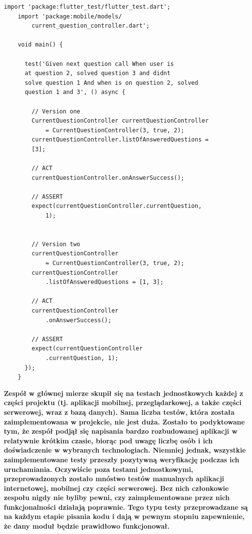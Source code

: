\documentclass[twoside]{projektInzynierskiMS}
\numberwithin{figure}{section}
\begin{document}
\begin{lstlisting}[caption=Zaimplementowany test jednostkowy w aplikacji mobilnej. Źródło: Opracowanie własne.,captionpos=b]
    import 'package:flutter_test/flutter_test.dart';
    import 'package:mobile/models/
        current_question_controller.dart';
    
    void main() {
    
      test('Given next question call When user is 
      at question 2, solved question 3 and didnt 
      solve question 1 And when is on question 2, solved 
      question 1 and 3', () async {
            
        // Version one
        CurrentQuestionController currentQuestionController 
            = CurrentQuestionController(3, true, 2);
        currentQuestionController.listOfAnsweredQuestions = 
        [3];
    
        // ACT
        currentQuestionController.onAnswerSuccess();
    
        // ASSERT
        expect(currentQuestionController.currentQuestion, 
            1);
    
    
        // Version two
        currentQuestionController 
            = CurrentQuestionController(3, true, 2);
        currentQuestionController
            .listOfAnsweredQuestions = [1, 3];
    
        // ACT
        currentQuestionController
            .onAnswerSuccess();
    
        // ASSERT
        expect(currentQuestionController
            .currentQuestion, 1);
      });
    }
\end{lstlisting}
\!

\textbf{Zespół w głównej mierze skupił się na testach jednostkowych każdej z części projektu (tj. aplikacji mobilnej, przeglądarkowej, a także części serwerowej, wraz z bazą danych). Sama liczba testów, która została zaimplementowana w projekcie, nie jest duża. Zostało to podyktowane tym, że zespół podjął się napisania bardzo rozbudowanej aplikacji w relatywnie krótkim czasie, biorąc pod uwagę liczbę osób i ich doświadczenie w wybranych technologiach. Niemniej jednak, wszystkie zaimplementowane testy przeszły pozytywną weryfikację podczas ich uruchamiania. Oczywiście poza testami jednostkowymi, przeprowadzonych zostało mnóstwo testów manualnych aplikacji internetowej, mobilnej czy części serwerowej. Bez nich członkowie zespołu nigdy nie byliby pewni, czy zaimplementowane przez nich funkcjonalności działają poprawnie. Tego typu testy przeprowadzane są na każdym etapie pisania kodu i dają w pewnym stopniu zapewnienie, że dany moduł będzie prawidłowo funkcjonował.}
    
\end{document}
